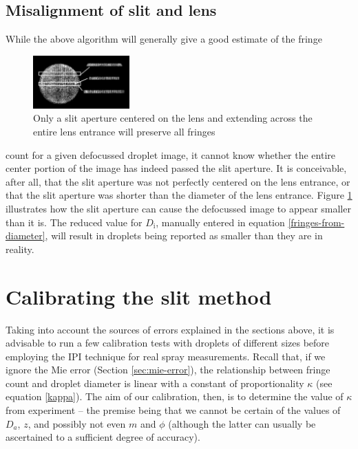 \documentclass[11.5pt]{book}
\begin{document}
\subsection{Misalignment of slit and lens}

While the above algorithm will generally give a good estimate of the fringe
\begin{figure}
    \begin{center}
\includegraphics[width=0.33\textwidth]{img/dropletslitcropping2.jpg}
\end{center}
\caption{Only a slit aperture centered on the lens and extending across the
entire lens entrance will preserve all fringes}
\label{fig:droplet-slitcropping}
\end{figure}

count for a given defocussed droplet image, it cannot know whether the entire
center portion of the image has indeed passed the slit aperture. It is
conceivable, after all, that the slit aperture was not perfectly centered on the
lens entrance, or that the slit aperture was shorter than the diameter of the
lens entrance. Figure \ref{fig:droplet-slitcropping} illustrates how the slit
aperture can cause the defocussed image to appear smaller than it is. The
reduced value for $D_\text{i}$, manually entered in equation
\eqref{fringes-from-diameter}, will result
in droplets being reported as smaller than they are in reality.

\section{Calibrating the slit method}
Taking into account the sources of errors explained in the sections above, it is
advisable to run a few calibration tests with droplets of different sizes before
employing the IPI technique for real spray measurements. Recall that, if we
ignore the Mie error (Section \ref{sec:mie-error}), the relationship between fringe count and droplet diameter
is linear with a constant of proportionality $\kappa$ (see equation
\eqref{kappa}). The aim of our calibration, then, is to determine the value of
$\kappa$ from experiment -- the premise being that we cannot be certain of the
values of $D_a$, $z$, and possibly not even $m$ and $\phi$ (although the latter
can usually be ascertained to a sufficient degree of accuracy).
\end{document}
